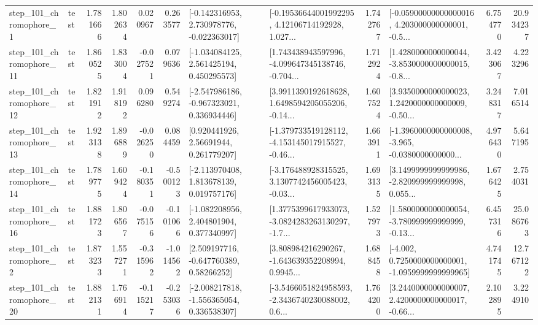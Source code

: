 \begin{tabular}{llrrrrllrlrr}
   step\_101\_chromophore\_1 &      test &      1.781666 &    1.802634 &      0.020967 &  0.263577 &   [-0.142316953, 2.730978776, -0.022363017] &  [-0.19536644001992295, 4.12106714192928, 1.027... &       1.742767 &  [-0.05900000000000016, 4.203000000000001, -0.5... &            6.754770 &         20.934237 \\
  step\_101\_chromophore\_11 &      test &      1.860525 &    1.833004 &     -0.027521 &  0.079636 &    [-1.034084125, 2.561425194, 0.450295573] &  [1.743438943597996, -4.099647345138746, -0.704... &       1.712924 &  [1.4280000000000044, -3.8530000000000015, -0.8... &            3.423067 &          4.223296 \\
  step\_101\_chromophore\_12 &      test &      1.821912 &    1.918192 &      0.096280 &  0.549274 &   [-2.547986186, -0.967323021, 0.336934446] &  [3.9911390192618628, 1.6498594205055206, -0.14... &       1.607524 &  [3.9350000000000023, 1.2420000000000009, -0.50... &            3.248317 &          7.016514 \\
  step\_101\_chromophore\_13 &      test &      1.923138 &    1.896889 &     -0.026250 &  0.084459 &      [0.920441926, 2.56691944, 0.261779207] &  [-1.379733519128112, -4.153145017915527, -0.46... &       1.663911 &  [-1.3960000000000008, -3.965, -0.0380000000000... &            4.976430 &          5.647195 \\
  step\_101\_chromophore\_14 &      test &      1.789775 &    1.609424 &     -0.180351 & -0.500123 &    [-2.113970408, 1.813678139, 0.019757176] &  [-3.176488928315525, 3.1307742456005423, -0.03... &       1.693135 &  [3.1499999999999986, -2.820999999999998, 0.055... &            1.676425 &          2.754031 \\
  step\_101\_chromophore\_16 &      test &      1.881723 &    1.806567 &     -0.075156 & -0.101066 &    [-1.082208956, 2.404801904, 0.377340997] &  [1.3775399617933073, -3.0824283263130297, -1.7... &       1.527973 &  [1.5800000000000054, -3.780999999999999, -0.13... &            6.457316 &         25.086763 \\
   step\_101\_chromophore\_2 &      test &      1.873233 &    1.557271 &     -0.315962 & -1.014562 &     [2.509197716, -0.647760389, 0.58266252] &  [3.808984216290267, -1.643639352208994, 0.9945... &       1.688458 &  [-4.002, 0.7250000000000001, -1.0959999999999965] &            4.741745 &         12.767122 \\
  step\_101\_chromophore\_20 &      test &      1.882131 &    1.766914 &     -0.115217 & -0.253036 &   [-2.008217818, -1.556365054, 0.336538307] &  [-3.5466051824958593, -2.3436740230088002, 0.6... &       1.764200 &  [3.2440000000000007, 2.4200000000000017, -0.66... &            2.102895 &          3.224910 \\

\end{tabular}
